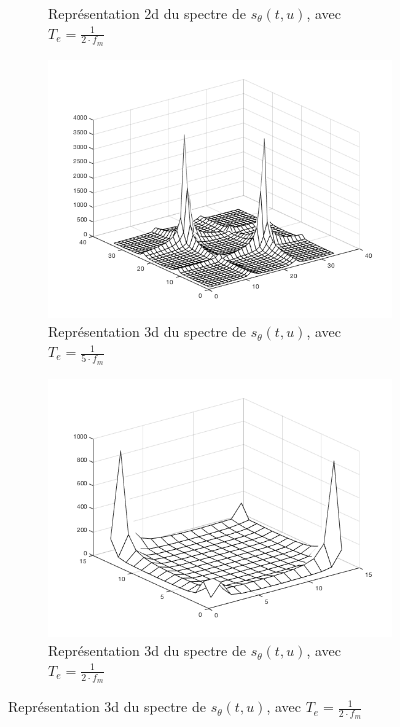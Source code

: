 \documentclass[a4paper]{article}
\begin{document}
\begin{figure}[H]
\begin{subfigure}[c]{0.46\textwidth}
        \caption{Représentation 2d du spectre de $s_{\theta}(t,u)$, avec $T_e=\frac{1}{2 \cdot f_m}$}
    \label{subimg:ft-2-2D}
    \end{subfigure}
    \begin{subfigure}[c]{0.46\textwidth}
        \centering
        \includegraphics[width=\textwidth]{images/ft23D.png}
        \caption{Représentation 3d du spectre de $s_{\theta}(t,u)$, avec $T_e=\frac{1}{5 \cdot f_m}$}
    \label{subimg:ft-5-3D}
    \end{subfigure}
    \begin{subfigure}[c]{0.46\textwidth}
        \centering
        \includegraphics[width=\textwidth]{images/ft33D.png}
        \caption{Représentation 3d du spectre de $s_{\theta}(t,u)$, avec $T_e=\frac{1}{2 \cdot f_m}$}
    \label{subimg:ft-2-3D}
    \end{subfigure}

    \label{img:sin-var}
\end{figure}
\end{document}
